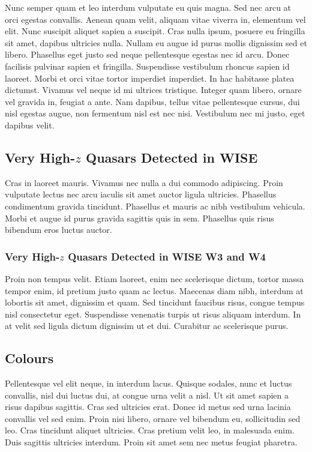 \documentclass[usenatbib]{mnras}
\begin{document}
Nunc semper quam et leo interdum vulputate eu quis magna. Sed nec arcu at orci egestas convallis. Aenean quam velit, aliquam vitae viverra in, elementum vel elit. Nunc suscipit aliquet sapien a suscipit. Cras nulla ipsum, posuere eu fringilla sit amet, dapibus ultricies nulla. Nullam eu augue id purus mollis dignissim sed et libero. Phasellus eget justo sed neque pellentesque egestas nec id arcu. Donec facilisis pulvinar sapien et fringilla. Suspendisse vestibulum rhoncus sapien id laoreet. Morbi et orci vitae tortor imperdiet imperdiet. In hac habitasse platea dictumst. Vivamus vel neque id mi ultrices tristique. Integer quam libero, ornare vel gravida in, feugiat a ante. Nam dapibus, tellus vitae pellentesque cursus, dui nisl egestas augue, non fermentum nisl est nec nisi. Vestibulum nec mi justo, eget dapibus velit.


\subsection{Very High-$z$ Quasars Detected in WISE}
\citet{Blain2013} 
Cras in laoreet mauris. Vivamus nec nulla a dui commodo adipiscing. Proin vulputate lectus nec arcu iaculis sit amet auctor ligula ultricies. Phasellus condimentum gravida tincidunt. Phasellus et mauris ac nibh vestibulum vehicula. Morbi et augue id purus gravida sagittis quis in sem. Phasellus quis risus bibendum eros luctus auctor.

\subsubsection{Very High-$z$ Quasars Detected in WISE W3 and W4}
Proin non tempus velit. Etiam laoreet, enim nec scelerisque dictum, tortor massa tempor enim, id pretium justo quam ac lectus. Maecenas diam nibh, interdum at lobortis sit amet, dignissim et quam. Sed tincidunt faucibus risus, congue tempus nisl consectetur eget. Suspendisse venenatis turpis ut risus aliquam interdum. In at velit sed ligula dictum dignissim ut et dui. Curabitur ac scelerisque purus.


\subsection{Colours}
Pellentesque vel elit neque, in interdum lacus. Quisque sodales, nunc et luctus convallis, nisl dui luctus dui, at congue urna velit a nisl. Ut sit amet sapien a risus dapibus sagittis. Cras sed ultricies erat. Donec id metus sed urna lacinia convallis vel sed enim. Proin nisi libero, ornare vel bibendum eu, sollicitudin sed leo. Cras tincidunt aliquet ultricies. Cras pretium velit leo, in malesuada enim. Duis sagittis ultricies interdum. Proin sit amet sem nec metus feugiat pharetra.
\end{document}

